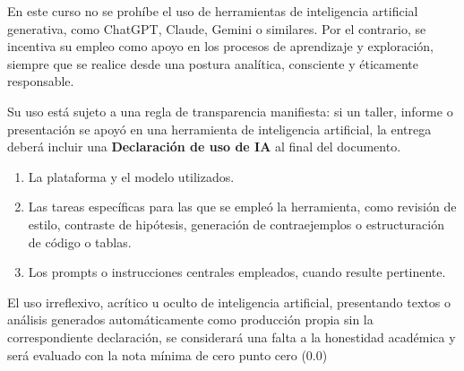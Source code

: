 En este curso no se prohíbe el uso de herramientas de inteligencia
artificial generativa, como ChatGPT, Claude, Gemini o similares.
Por el contrario, se incentiva su empleo como apoyo en los procesos
de aprendizaje y exploración, siempre que se realice desde una
postura analítica, consciente y éticamente responsable.

Su uso está sujeto a una regla de transparencia manifiesta: si un
taller, informe o presentación se apoyó en una herramienta de
inteligencia artificial, la entrega deberá incluir una
\textbf{Declaración de uso de IA} al final del documento.

\begin{enumerate}[
    label=\roman*),
    leftmargin=*,
    itemsep=3pt
]

\item
La plataforma y el modelo utilizados.

\item
Las tareas específicas para las que se empleó la herramienta, como
revisión de estilo, contraste de hipótesis, generación de
contraejemplos o estructuración de código o tablas.

\item
Los prompts o instrucciones centrales empleados, cuando resulte
pertinente.

\end{enumerate}

El uso irreflexivo, acrítico u oculto de inteligencia artificial,
presentando textos o análisis generados automáticamente como
producción propia sin la correspondiente declaración, se
considerará una falta a la honestidad académica y será evaluado con
la nota mínima de cero punto cero (0.0)
